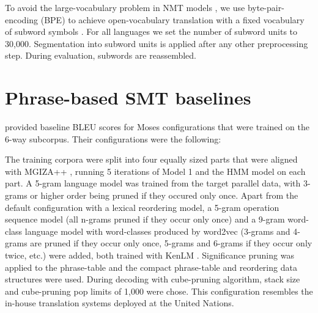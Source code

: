 \documentclass[11pt]{article}
\begin{document}
To avoid the large-vocabulary problem in NMT models \cite{44929}, we use byte-pair-encoding (BPE) to achieve open-vocabulary translation with a fixed vocabulary of subword symbols \cite{DBLP:journals/corr/SennrichHB15}. For all languages we set the number of subword units to 30,000. Segmentation into subword units is applied after any other preprocessing step. During evaluation, subwords are reassembled. 

\section{Phrase-based SMT baselines}
\label{pbmtbaselines}
\cite{ZIEMSKI16.1195} provided baseline BLEU scores for Moses \cite{Koehn:2007:MOS:1557769.1557821} configurations that were trained on the 6-way subcorpus. Their configurations were the following:

The training corpora were split into four equally sized parts that were aligned with MGIZA++ \cite{gao-vogel:2008:SETQANLP}, running 5 iterations of Model 1 and the HMM model on each part.
A 5-gram language model was trained from the target parallel data, with 3-grams or higher order being pruned if they occured only once. Apart from the default configuration with a lexical reordering model, a 5-gram operation sequence model \cite{conf/acl/DurraniFSHK13} (all n-grams pruned if they occur only once) and a 9-gram word-class language model with word-classes produced by word2vec \cite{journals/corr/abs-1301-3781} (3-grams and 4-grams are pruned if they occur only once, 5-grams and 6-grams if they occur only twice, etc.) were added, both trained with KenLM \cite{Heafield-estimate}. Significance pruning \cite{DBLP:conf/emnlp/JohnsonMFK07} was applied to the phrase-table and the compact phrase-table and reordering data structures \cite{junczys_mtm_2012} were used.
During decoding with cube-pruning algorithm, stack size and cube-pruning pop limits of 1,000 were chose. This configuration resembles the in-house translation systems deployed at the United Nations.
\end{document}
